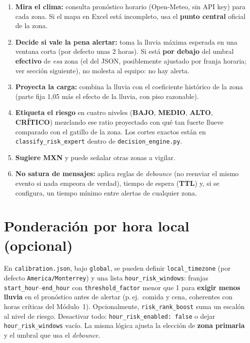 \documentclass[11pt,a4paper]{article}
\begin{document}
\begin{enumerate}
  \item \textbf{Mira el clima:} consulta pronóstico horario (Open-Meteo, sin API key) para cada zona. Si el mapa en Excel está incompleto, usa el \textbf{punto central} oficial de la zona.
  \item \textbf{Decide si vale la pena alertar:} toma la lluvia máxima esperada en una ventana corta (por defecto unas 2 horas). Si está \textbf{por debajo} del umbral \textbf{efectivo} de \emph{esa} zona (el del JSON, posiblemente ajustado por franja horaria; ver sección siguiente), no molesta al equipo: no hay alerta.
  \item \textbf{Proyecta la carga:} combina la lluvia con el coeficiente histórico de la zona (parte fija 1{,}05 más el efecto de la lluvia, con piso razonable).
  \item \textbf{Etiqueta el riesgo} en cuatro niveles (\textbf{BAJO}, \textbf{MEDIO}, \textbf{ALTO}, \textbf{CRÍTICO}) mezclando ese ratio proyectado con qué tan fuerte llueve comparado con el gatillo de la zona. Los cortes exactos están en \texttt{classify\_risk\_expert} dentro de \texttt{decision\_engine.py}.
  \item \textbf{Sugiere MXN} y puede señalar otras zonas a vigilar.
  \item \textbf{No satura de mensajes:} aplica reglas de \emph{debounce} (no reenviar el mismo evento si nada empeora de verdad), tiempo de espera (\textbf{TTL}) y, si se configura, un tiempo mínimo entre alertas de cualquier zona.
\end{enumerate}

\section*{Ponderación por hora local (opcional)}

\noindent En \texttt{calibration.json}, bajo \texttt{global}, se pueden definir \texttt{local\_timezone} (por defecto \texttt{America/Monterrey}) y una lista \texttt{hour\_risk\_windows}: franjas \texttt{start\_hour}--\texttt{end\_hour} con \texttt{threshold\_factor} menor que 1 para \textbf{exigir menos lluvia} en el pronóstico antes de alertar (p.\,ej.\ comida y cena, coherentes con horas críticas del Módulo~1). Opcionalmente, \texttt{risk\_rank\_boost} suma un escalón al nivel de riesgo. Desactivar todo: \texttt{hour\_risk\_enabled:\ false} o dejar \texttt{hour\_risk\_windows} vacío. La misma lógica ajusta la elección de \textbf{zona primaria} y el umbral que usa el \emph{debounce}.
\end{document}
